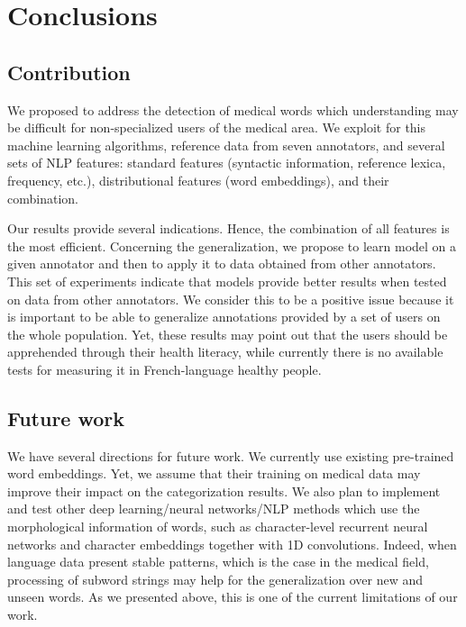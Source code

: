 \section{Conclusions}
\label{sec:conclusions}

\subsection{Contribution}

We proposed to address the detection of medical words which understanding may be difficult for non-specialized users of the medical area. We exploit for this machine learning algorithms,
reference data from seven annotators, and several sets of NLP features: standard features (syntactic information, reference lexica, frequency, etc.), distributional features (word embeddings), and their
combination.

Our results provide several indications.
Hence, the combination of all features is the most efficient.
Concerning the generalization, we propose to learn model on a given
annotator and then to apply it to data obtained from other annotators.
This set of experiments indicate that models provide better results
when tested on data from other annotators.
We consider this to be a positive issue because it is important to be
able to generalize annotations provided by a set of users on the whole
population.
Yet, these results may point out that the users should be apprehended
through their health literacy, while currently there is no available
tests for measuring it in French-language healthy people.

\subsection{Future work}
We have several directions for future work. We currently use existing pre-trained word embeddings. Yet, we assume that their training on medical data may improve their impact on the categorization results. We also plan to implement and test other deep learning/neural networks/NLP methods which use the morphological information of words, such as character-level recurrent neural networks and character embeddings together with 1D convolutions. Indeed, when language data present stable patterns, which is the case in the medical field, processing of subword strings may help for the generalization over new and unseen words. As we presented above, this is one of the current limitations of our work. 